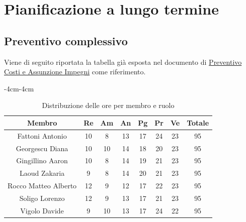 \documentclass[a4paper,12pt]{article}
\begin{document}
\section{Pianificazione a lungo termine}



\subsection{Preventivo complessivo}
Viene di seguito riportata la tabella già esposta nel documento di \href{https://cdn.jsdelivr.net/gh/7-zpus/Docs@main/1_Candidatura/PreventivoCostiEAssunzioneImpegni.pdf}{Preventivo Costi e Assunzione Impegni} come riferimento.
\begin{table}[H]
    \begin{adjustwidth}{-4cm}{-4cm}
    \centering
    \begin{tabular}{|c|c|c|c|c|c|c|c|}
        \hline
        \textbf{Membro} & \textbf{Re} & \textbf{Am} & \textbf{An} & \textbf{Pg} & \textbf{Pr} & \textbf{Ve} & \textbf{Totale} \\
        \hline
        Fattoni Antonio & 10 & 8 & 13 & 17 & 24 & 23 & 95 \\
        \hline
        Georgescu Diana & 10 & 10 & 14 & 18 & 20 & 23 & 95 \\
        \hline
        Gingillino Aaron & 10 & 8 & 14 & 19 & 21 & 23 & 95 \\
        \hline
        Laoud Zakaria & 9 & 8 & 14 & 20 & 21 & 23 & 95 \\
        \hline
        Rocco Matteo Alberto & 12 & 9 & 12 & 17 & 22 & 23 & 95 \\
        \hline
        Soligo Lorenzo & 12 & 9 & 13 & 17 & 21 & 23 & 95 \\
        \hline
        Vigolo Davide & 9 & 10 & 13 & 17 & 24 & 22 & 95 \\
        \hline
    \end{tabular}
    \caption{Distribuzione delle ore per membro e ruolo}
    \end{adjustwidth}
\end{table}
\newpage
\end{document}
